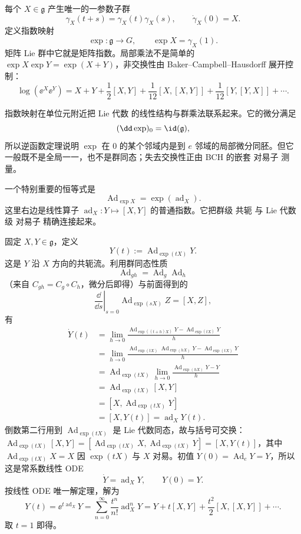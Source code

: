 每个 $X\in\mathfrak g$ 产生唯一的一参数子群
\[
\gamma_X(t+s)=\gamma_X(t)\gamma_X(s),
\qquad
\dot\gamma_X(0)=X.
\]
定义指数映射
\[
\exp:\mathfrak g\to G,
\qquad
\exp X=\gamma_X(1).
\]
矩阵 Lie 群中它就是矩阵指数。局部乘法不是简单的 $\exp X\exp Y=\exp(X+Y)$，非交换性由 Baker--Campbell--Hausdorff 展开控制：
\begin{equation*}\log(\ee^X\ee^Y)
=X+Y+\frac12[X,Y]
+\frac1{12}[X,[X,Y]]
+\frac1{12}[Y,[Y,X]]+\cdots.\end{equation*}

指数映射在单位元附近把 Lie 代数 的线性结构与群乘法联系起来。它的微分满足
\[
(\dd\exp)_0=\id(\mathfrak g),
\]
所以逆函数定理说明 $\exp$ 在 $0$ 的某个邻域内是到 $e$ 邻域的局部微分同胚。但它一般既不是全局一一，也不是群同态；失去交换性正由 BCH 的嵌套 对易子 测量。

一个特别重要的恒等式是
\begin{equation}
{
\operatorname{Ad}_{\exp X}
=\exp(\operatorname{ad}_X).
}
\label{eq:math-lie-ad-exp}
\end{equation}
这里右边是线性算子 $\operatorname{ad}_X:Y\mapsto[X,Y]$ 的普通指数。它把群级 共轭 与 Lie 代数 级 对易子 精确连接起来。

固定 $X,Y\in\mathfrak g$，定义
\[
Y(t):=\operatorname{Ad}_{\exp(tX)}Y.
\]
这是 $Y$ 沿 $X$ 方向的共轭流。利用群同态性质
\[
\operatorname{Ad}_{gh}=\operatorname{Ad}_g\operatorname{Ad}_h
\]
（来自 $C_{gh}=C_g\circ C_h$，微分后即得）与前面得到的
\[
\left.\frac{\dd}{\dd s}\right|_{s=0}
\operatorname{Ad}_{\exp(sX)}Z
=[X,Z],
\]
有
\[
\begin{aligned}
\dot Y(t)
&=\lim_{h\to0}
\frac{\operatorname{Ad}_{\exp((t+h)X)}Y-
\operatorname{Ad}_{\exp(tX)}Y}{h}\\
&=\lim_{h\to0}
\frac{\operatorname{Ad}_{\exp(tX)}\operatorname{Ad}_{\exp(hX)}Y-
\operatorname{Ad}_{\exp(tX)}Y}{h}\\
&=\operatorname{Ad}_{\exp(tX)}
\lim_{h\to0}\frac{\operatorname{Ad}_{\exp(hX)}Y-Y}{h}\\
&=\operatorname{Ad}_{\exp(tX)}[X,Y]\\
&=[X,\operatorname{Ad}_{\exp(tX)}Y]\\
&=[X,Y(t)]
=\operatorname{ad}_X Y(t).
\end{aligned}
\]
倒数第二行用到 $\operatorname{Ad}_{\exp(tX)}$ 是 Lie 代数同态，故与括号可交换：$\operatorname{Ad}_{\exp(tX)}[X,Y]=[\operatorname{Ad}_{\exp(tX)}X,\operatorname{Ad}_{\exp(tX)}Y]=[X,Y(t)]$，其中 $\operatorname{Ad}_{\exp(tX)}X=X$ 因 $\exp(tX)$ 与 $X$ 对易。初值 $Y(0)=\operatorname{Ad}_{e}Y=Y$，所以这是常系数线性 ODE
\[
\dot Y=\operatorname{ad}_X Y,\qquad Y(0)=Y.
\]
按线性 ODE 唯一解定理，解为
\[
Y(t)=\ee^{t\operatorname{ad}_X}Y
=\sum_{n=0}^\infty\frac{t^n}{n!}\operatorname{ad}_X^n Y
=Y+t[X,Y]+\frac{t^2}{2}[X,[X,Y]]+\cdots.
\]
取 $t=1$ 即得。

